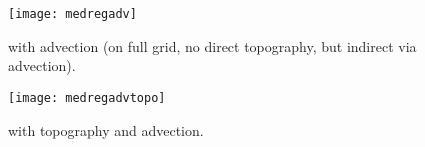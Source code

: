 \begin{figure}[H]
\centering
\parbox{.6\textwidth}{
\texttt{[image: medregadv]}
}\parbox{.4\textwidth}{
\caption{\diva with advection (on full grid, no direct topography, but indirect 
via advection).\label{fig:medsea_adv}}
}
\end{figure}


\begin{figure}[H]
\centering
\parbox{.6\textwidth}{
\texttt{[image: medregadvtopo]}
}\parbox{.4\textwidth}{
\caption{\diva with topography and advection.}
}
\end{figure}



